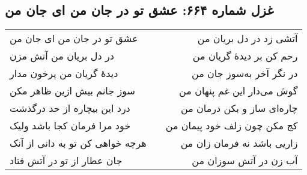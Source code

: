 \begin{center}
\section*{غزل شماره ۶۶۴: عشق تو در جان من ای جان من}
\label{sec:664}
\begin{longtable}{l p{0.5cm} r}
عشق تو در جان من ای جان من
&&
آتشی زد در دل بریان من
\\
در دل بریان من آتش مزن
&&
رحم کن بر دیدهٔ گریان من
\\
دیدهٔ گریان من پرخون مدار
&&
در نگر آخر به‌سوز جان من
\\
سوز جانم بیش ازین ظاهر مکن
&&
گوش می‌دار این غم پنهان من
\\
درد این بیچاره از حد درگذشت
&&
چاره‌ای ساز و بکن درمان من
\\
خود مرا فرمان کجا باشد ولیک
&&
کج مکن چون زلف خود پیمان من
\\
هرچه خواهی کن تو به دانی از آنک
&&
زاریی باشد نه فرمان زان من
\\
جان عطار از تو در آتش فتاد
&&
آب زن در آتش سوزان من
\\
\end{longtable}
\end{center}
